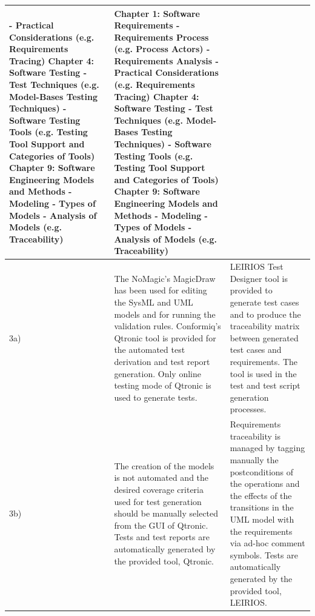 \begin{landscape}
\begin{small}
\begin{longtable}{ p{0.5cm} | p{11cm} | p{11cm} }
\newline - Practical Considerations (e.g. Requirements Tracing)
\newline Chapter 4: Software Testing
\newline - Test Techniques (e.g. Model-Bases Testing Techniques)
\newline -  Software Testing Tools (e.g. Testing Tool Support and Categories of Tools)
\newline Chapter 9: Software Engineering Models and Methods 
\newline - Modeling
\newline - Types of Models
\newline - Analysis of Models (e.g. Traceability) & Chapter 1: Software Requirements 
\newline - Requirements Process (e.g. Process Actors)
\newline - Requirements Analysis
\newline - Practical Considerations (e.g. Requirements Tracing)
\newline Chapter 4: Software Testing
\newline - Test Techniques (e.g. Model-Bases Testing Techniques)
\newline -  Software Testing Tools (e.g. Testing Tool Support and Categories of Tools)
\newline Chapter 9: Software Engineering Models and Methods 
\newline - Modeling
\newline - Types of Models
\newline - Analysis of Models (e.g. Traceability) \\  
\hline
3a) & The NoMagic’s MagicDraw has been used for editing the SysML and UML models and for running the validation rules. \newline Conformiq’s Qtronic tool is provided for the automated test derivation and test report generation. Only online testing mode of Qtronic is used to generate tests. & LEIRIOS Test Designer tool is provided to generate test cases and to produce the traceability matrix between generated test cases and requirements. The tool is used in the test and test script generation processes.\\
\hline
3b) & The creation of the models is not automated and the desired coverage criteria used for test generation should be manually selected from the GUI of Qtronic. Tests and test reports are automatically generated by the provided tool, Qtronic. &Requirements traceability is managed by tagging manually the postconditions of the operations and the effects of the transitions in the UML model with the requirements via ad-hoc comment symbols. Tests are automatically generated by the provided tool, LEIRIOS.\\

\end{longtable}
\end{small}
\end{landscape}
